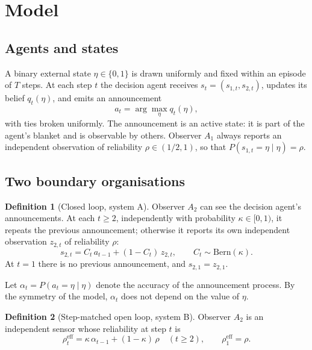 \documentclass[11pt]{article}
\theoremstyle{definition}
\newtheorem{definition}{Definition}
\theoremstyle{remark}
\newcommand{\reff}{\rho^{\mathrm{eff}}}
\begin{document}
\section{Model}\label{sec:model}

\subsection{Agents and states}

A binary external state $\eta\in\{0,1\}$ is drawn uniformly and fixed within an
episode of $T$ steps. At each step $t$ the decision agent receives
$s_t=(s_{1,t},s_{2,t})$, updates its belief $q_t(\eta)$, and emits an
announcement
\begin{equation}
a_t=\arg\max_\eta q_t(\eta),
\end{equation}
with ties broken uniformly. The announcement is an active state: it is part of
the agent's blanket and is observable by others. Observer $A_1$ always reports
an independent observation of reliability $\rho\in(1/2,1)$, so that
$P(s_{1,t}=\eta\mid\eta)=\rho$.

\subsection{Two boundary organisations}

\begin{definition}[Closed loop, system A]
Observer $A_2$ can see the decision agent's announcements. At each $t\ge2$,
independently with probability $\kappa\in[0,1)$, it repeats the previous
announcement; otherwise it reports its own independent observation $z_{2,t}$
of reliability $\rho$:
\begin{equation}
s_{2,t}=C_t\,a_{t-1}+(1-C_t)\,z_{2,t},\qquad C_t\sim\mathrm{Bern}(\kappa).
\label{eq:loop}
\end{equation}
At $t=1$ there is no previous announcement, and $s_{2,1}=z_{2,1}$.
\end{definition}

Let $\alpha_{t}=P(a_{t}=\eta\mid\eta)$ denote the accuracy of the announcement
process. By the symmetry of the model, $\alpha_t$ does not depend on the value of
$\eta$.

\begin{definition}[Step-matched open loop, system B]
Observer $A_2$ is an independent sensor whose reliability at step $t$ is
\begin{equation}
\reff_t=\kappa\,\alpha_{t-1}+(1-\kappa)\,\rho\quad(t\ge2),\qquad \reff_1=\rho.
\label{eq:reff}
\end{equation}
\end{definition}
\end{document}
